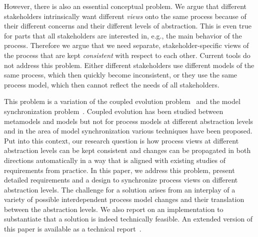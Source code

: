 However, there is also an essential conceptual problem. We argue that different stakeholders intrinsically want different \emph{views} onto the same process because of their different concerns and their different levels of abstraction. This is even true for parts that all stakeholders are interested in, e.g., the main behavior of the process.
Therefore we argue that we need separate, stakeholder-specific views of the process that are kept \emph{consistent} with respect to each other. Current tools do not address this problem. Either different stakeholders use different models of the same process, which then quickly become inconsistent, or they use the same process model, which then cannot reflect the needs of all stakeholders.

This problem is a variation of the coupled evolution problem~\cite{HerrmannsdoerferBJ09} and the model synchronization problem~\cite{GieseW09}. Coupled evolution has been studied between metamodels and models but not for process models at different abstraction levels and in the area of model synchronization various techniques have been proposed. Put into this context, our research question is how process views at different abstraction levels can be kept consistent and changes can be propagated in both directions automatically in a way that is aligned with existing studies of requirements from practice. In this paper, we address this problem, present detailed requirements and a design to synchronize process views on different abstraction levels. The challenge for a solution arises from an interplay of a variety of possible interdependent process model changes and their translation between the abstraction levels. We also report on an implementation to substantiate that a solution is indeed technically feasible. An extended version of this paper is available as a technical report~\cite{KVF+TR}.
 



